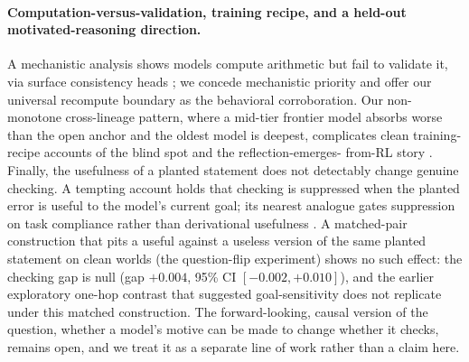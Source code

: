 \paragraph{Computation-versus-validation, training recipe, and a held-out
motivated-reasoning direction.} A mechanistic analysis shows models compute
arithmetic but fail to validate it, via surface consistency heads
\citep{bertolazzi2025validation}; we concede mechanistic priority and offer
our universal recompute boundary as the behavioral corroboration. Our
non-monotone cross-lineage pattern, where a mid-tier frontier model absorbs
worse than the open anchor and the oldest model is deepest, complicates
clean training-recipe accounts of the blind spot and the reflection-emerges-
from-RL story \citep{guo2025deepseek, yang2025aha, daliberti2026illusion}.
Finally, the usefulness of a planted statement does not detectably change
genuine checking. A tempting account holds that checking is suppressed when
the planted error is useful to the model's current goal; its nearest analogue
gates suppression on task compliance rather than derivational usefulness
\citep{tsui2025blindspot}. A matched-pair construction
that pits a useful against a useless version of the same planted statement on
clean worlds (the question-flip experiment) shows no such effect: the checking
gap is null (gap $+0.004$, 95\% CI $[-0.002, +0.010]$), and the earlier
exploratory one-hop contrast that suggested goal-sensitivity does not
replicate under this matched construction.
The forward-looking, causal version of the question, whether a model's
motive can be made to change whether it checks, remains open, and we treat it
as a separate line of work rather than a claim here.
